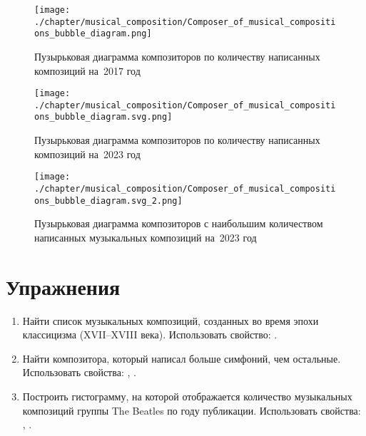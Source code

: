 \begin{figure*}
	\texttt{[image: ./chapter/musical\_composition/Composer\_of\_musical\_compositions\_bubble\_diagram.png]}
	\caption[Пузырьковая диаграмма композиторов по количеству написанных композиций на~2017 год]{Пузырьковая диаграмма композиторов по количеству написанных композиций на~2017 год}%
 	\label{fig:bubbleChart}%
\end{figure*}
\begin{figure*}
	\texttt{[image: ./chapter/musical\_composition/Composer\_of\_musical\_compositions\_bubble\_diagram.svg.png]}
	\caption[Пузырьковая диаграмма композиторов по количеству написанных композиций на~2023 год]{Пузырьковая диаграмма композиторов по количеству написанных композиций на~2023 год}%
	\label{fig:bubbleChart2}%
\end{figure*}

\begin{figure*}
	\texttt{[image: ./chapter/musical\_composition/Composer\_of\_musical\_compositions\_bubble\_diagram.svg\_2.png]}
	\caption[Пузырьковая диаграмма композиторов с наибольшим количеством написанных музыкальных композиций на~2023 год]{Пузырьковая диаграмма композиторов с наибольшим количеством написанных музыкальных композиций на~2023 год}%
	\label{fig:bubbleChart3}%
\end{figure*}

\newpage

\section{Упражнения}
\begin{enumerate}
\item Найти список музыкальных композиций, созданных во время эпохи классицизма (XVII--XVIII века).
Использовать свойство: .
\item Найти композитора, который написал больше симфоний, чем остальные.
Использовать свойства: , .
\item Построить гистограмму, на которой отображается количество музыкальных композиций группы The Beatles по году публикации.
Использовать свойства: , .
\end{enumerate}
